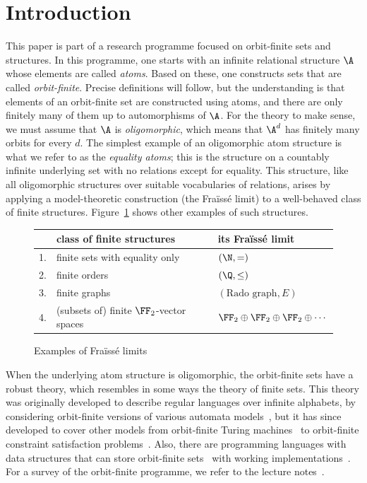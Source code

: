 \section{Introduction}
This paper is part of a research programme focused on orbit-finite sets and structures. 
In this programme, one starts with an infinite relational structure $\A$ whose elements are called \emph{atoms}. 
Based on these, one constructs sets that are called \emph{orbit-finite}. 
Precise definitions will follow, but the understanding is that elements of an orbit-finite set are constructed using atoms, and there are only finitely many of them up to automorphisms of $\A$. 
For the theory to make sense, we must assume that $\A$ is \emph{oligomorphic}, which means that $\A^d$ has finitely many orbits for every $d$. 
The simplest example of an oligomorphic atom structure is what we refer to as the \emph{equality atoms}; 
this is the structure on a countably infinite underlying set with no relations except for equality. 
This structure, like all oligomorphic structures over suitable vocabularies of relations, arises by applying a model-theoretic construction (the Fraïssé limit) to a well-behaved class of finite structures. 
Figure~\ref{fig:fraisse-limits} shows other examples of such structures. 
\begin{figure}
    \begin{center}
    \begin{tabular}{lll}
   &  class of finite structures & its Fraïssé limit\\
    \toprule
    1.& finite sets with equality only & $(\N, =)$ \\
    2.& finite orders & $(\Q, \leq)$ \\
    3.& finite graphs & $(\text{Rado graph}, E)$ \\ 
    4.& (subsets of) finite $\FF_2$-vector spaces & $\FF_2 \oplus \FF_2 \oplus \FF_2 \oplus \cdots$ 
    \\
    \bottomrule  
\end{tabular}
\end{center}
\caption{\label{fig:fraisse-limits} Examples of Fraïssé limits}
\end{figure}

When the underlying atom structure is oligomorphic, the orbit-finite sets have a robust theory, which resembles in some ways the theory of finite sets. 
This theory was originally developed to describe regular languages over infinite alphabets, by considering orbit-finite versions of various automata models~\cite{bojanczykNominalMonoids2013,bojanczykAutomataTheoryNominal2014}, but it has since developed to cover other models from orbit-finite Turing machines~\cite{bojanczykTuringMachinesAtoms2013} to orbit-finite constraint satisfaction problems~\cite{klin2015locally}.
Also, there are programming languages with data structures that can store  orbit-finite sets~\cite{bojanczyk2012towards,bojanczyk2012imperative} with working implementations~\cite{kopczynski2016lois, szynwelski-phd}. For a survey of the orbit-finite programme, we refer to the lecture notes~\cite{bojanczyk_slightly}. 

